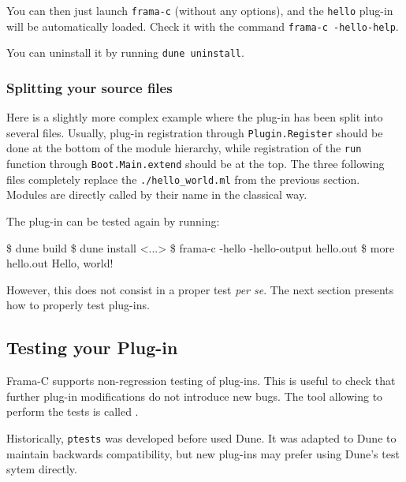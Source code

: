 You can then just launch \texttt{frama-c} (without any options), and the
\texttt{hello} plug-in will be automatically loaded. Check it with the command
\verb|frama-c -hello-help|.

You can uninstall it by running \verb|dune uninstall|.

\subsubsection*{Splitting your source files}

Here is a slightly more complex example where the plug-in has been split into
several files. Usually, plug-in registration through \texttt{Plugin.Register}
should be done at the bottom of the module hierarchy, while registration of the
\texttt{run} function through \texttt{Boot.Main.extend} should be at the top.
The three following files completely replace the \texttt{./hello\_world.ml}
from the previous section. Modules are directly called by their name in the
classical \ocaml way.




The plug-in can be tested again by running:

\begin{shell}
\$ dune build
\$ dune install
<...>
\$ frama-c -hello -hello-output hello.out
\$ more hello.out
Hello, world!
\end{shell}

However, this does not consist in a proper test \emph{per se}. The next section
presents how to properly test plug-ins.

\subsection{Testing your Plug-in}\label{tut2:testing}

Frama-C supports non-regression testing of plug-ins. This is useful to check
that further plug-in modifications do not introduce new bugs. The tool allowing
to perform the tests is called \ptests{}.

\begin{important}
  Historically, \texttt{ptests} was developed before \framac used Dune. It was
  adapted to Dune to maintain backwards compatibility, but new plug-ins may
  prefer using Dune's test sytem directly.
\end{important}

